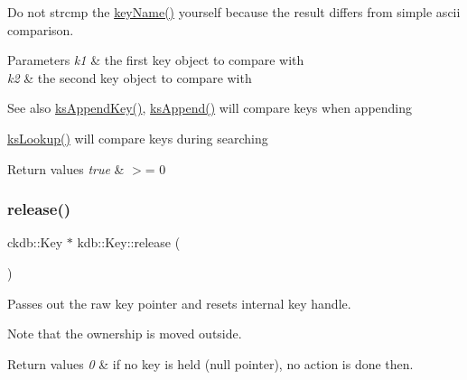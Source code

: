 Do not strcmp the \mbox{\hyperlink{group__keyname_ga8e805c726a60da921d3736cda7813513}{key\+Name()}} yourself because the result differs from simple ascii comparison.


\begin{DoxyParams}{Parameters}
{\em k1} & the first key object to compare with \\
\hline
{\em k2} & the second key object to compare with\\
\hline
\end{DoxyParams}
\begin{DoxySeeAlso}{See also}
\mbox{\hyperlink{group__keyset_gaa5a1d467a4d71041edce68ea7748ce45}{ks\+Append\+Key()}}, \mbox{\hyperlink{group__keyset_ga21eb9c3a14a604ee3a8bdc779232e7b7}{ks\+Append()}} will compare keys when appending 

\mbox{\hyperlink{group__keyset_gaa34fc43a081e6b01e4120daa6c112004}{ks\+Lookup()}} will compare keys during searching
\end{DoxySeeAlso}

\begin{DoxyRetVals}{Return values}
{\em true} & $>$= 0 \\
\hline
\end{DoxyRetVals}
\mbox{\label{classkdb_1_1Key_a9ae719043e6e99f5f3d6fb85837306f8}} 
\subsubsection{\texorpdfstring{release()}{release()}}
{\footnotesize\ttfamily ckdb\+::\+Key $\ast$ kdb\+::\+Key\+::release (\begin{DoxyParamCaption}{ }\end{DoxyParamCaption})\hspace{0.3cm}{\ttfamily [inline]}}



Passes out the raw key pointer and resets internal key handle. 

\begin{DoxyNote}{Note}
that the ownership is moved outside.
\end{DoxyNote}

\begin{DoxyRetVals}{Return values}
{\em 0} & if no key is held (null pointer), no action is done then. \\
\hline
\end{DoxyRetVals}
\mbox{\label{classkdb_1_1Key_a002af206119ceed17b106e2449cedc91}} 

